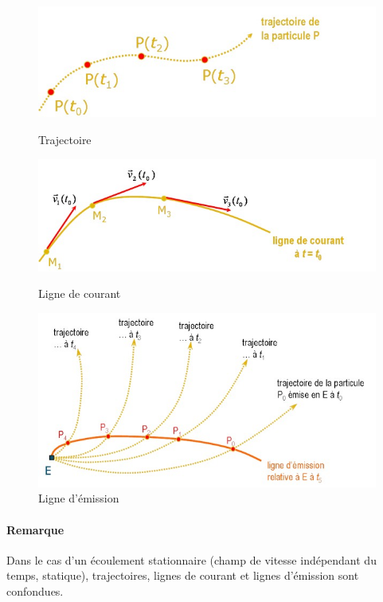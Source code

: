 \begin{figure}
    \begin{minipage}[b]{0.4\linewidth}
        \includegraphics[scale=0.75]{trajectoire.jpg}
        \caption{Trajectoire}
    \end{minipage}\hfill
    \begin{minipage}[b]{0.4\linewidth}
         \includegraphics[scale=0.75]{courant.jpg}
        \caption{Ligne de courant}
    \end{minipage}
    \begin{minipage}[c]{0.4\linewidth}
       \begin{center}
 \includegraphics[scale=0.75]{emission.jpg}
\end{center}
        \caption{Ligne d'émission}
    \end{minipage}
\end{figure}
\paragraph{Remarque}Dans le cas d'un écoulement stationnaire (champ de vitesse indépendant du temps, statique), trajectoires, lignes de courant et lignes d'émission sont confondues.
